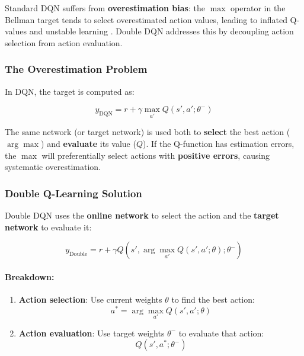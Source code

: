 Standard DQN suffers from \textbf{overestimation bias}: the $\max$ operator in the Bellman target tends to select overestimated action values, leading to inflated Q-values and unstable learning \cite{HGS16}. Double DQN addresses this by decoupling action selection from action evaluation.

\subsubsection{The Overestimation Problem}

In DQN, the target is computed as:

\begin{equation}
y_{\text{DQN}} = r + \gamma \max_{a'} Q(s', a'; \theta^-)
\end{equation}

The same network (or target network) is used both to \textbf{select} the best action ($\arg\max$) and \textbf{evaluate} its value ($Q$). If the Q-function has estimation errors, the $\max$ will preferentially select actions with \textbf{positive errors}, causing systematic overestimation.

\subsubsection{Double Q-Learning Solution}

Double DQN uses the \textbf{online network} to select the action and the \textbf{target network} to evaluate it:

\begin{equation}
y_{\text{Double}} = r + \gamma Q(s', \arg\max_{a'} Q(s', a'; \theta); \theta^-)
\end{equation}

\paragraph{Breakdown:}

\begin{enumerate}
\item \textbf{Action selection}: Use current weights $\theta$ to find the best action:
   \begin{equation}
   a^* = \arg\max_{a'} Q(s', a'; \theta)
   \end{equation}

\item \textbf{Action evaluation}: Use target weights $\theta^-$ to evaluate that action:
   \begin{equation}
   Q(s', a^*; \theta^-)
   \end{equation}
\end{enumerate}

